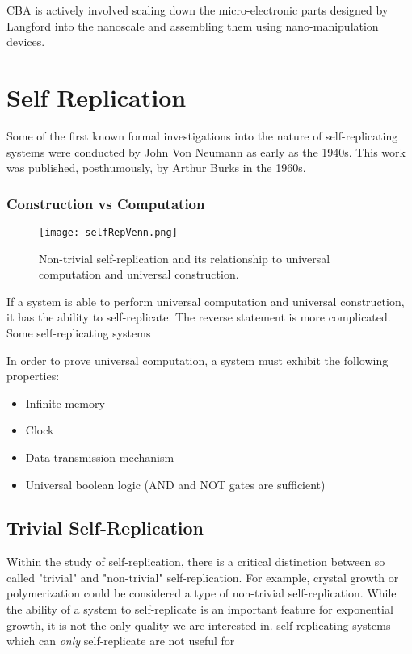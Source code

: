 {CBA is actively involved scaling down the micro-electronic parts designed by Langford\cite{Langford2014} into the nanoscale and assembling them using nano-manipulation devices.

\section{Self Replication}

Some of the first known formal investigations into the nature of self-replicating systems were conducted by John Von Neumann as early as the 1940s.  This work was published, posthumously, by Arthur Burks in the 1960s\cite{Burks1969}.

\subsubsection{Construction vs Computation}

\begin{figure}
  \texttt{[image: selfRepVenn.png]}
  \caption{Non-trivial self-replication and its relationship to universal computation and universal construction.}
  \label{fig:selfRepVenn}
\end{figure}


If a system is able to perform universal computation and universal construction, it has the ability to self-replicate.  The reverse statement is more complicated.  Some self-replicating systems

In order to prove universal computation, a system must exhibit the following properties:
\begin{itemize}
  \item Infinite memory
  \item Clock
  \item Data transmission mechanism
  \item Universal boolean logic (AND and NOT gates are sufficient)
\end{itemize}




\subsection{Trivial Self-Replication}

Within the study of self-replication, there is a critical distinction between so called "trivial" and "non-trivial" self-replication.
For example, crystal growth or polymerization could be considered a type of non-trivial self-replication.
While the ability of a system to self-replicate is an important feature for exponential growth, it is not the only quality we are interested in.
self-replicating systems which can \textit{only} self-replicate are not useful for 

}
